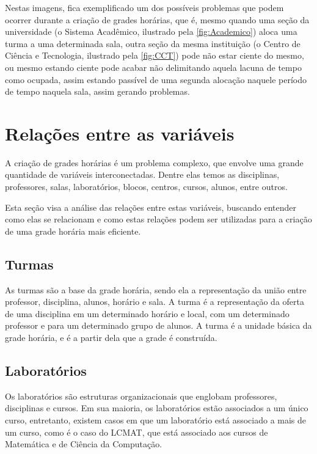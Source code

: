 Nestas imagens, fica exemplificado um dos possíveis problemas que podem ocorrer durante a criação de grades horárias, que é, mesmo quando uma seção da universidade (o Sistema Acadêmico, ilustrado pela \autoref{fig:Academico}) aloca uma turma a uma determinada sala, outra seção da mesma instituição (o Centro de Ciência e Tecnologia, ilustrado pela \autoref{fig:CCT}) pode não estar ciente do mesmo, ou mesmo estando ciente pode acabar não delimitando aquela lacuna de tempo como ocupada, assim estando passível de uma segunda alocação naquele período de tempo naquela sala, assim gerando problemas.

\section{Relações entre as variáveis} %

A criação de grades horárias é um problema complexo, que envolve uma grande quantidade de variáveis interconectadas. Dentre elas temos as disciplinas, professores, salas, laboratórios, blocos, centros, cursos, alunos, entre outros.

Esta seção visa a análise das relações entre estas variáveis, buscando entender como elas se relacionam e como estas relações podem ser utilizadas para a criação de uma grade horária mais eficiente.

\subsection{Turmas}

As turmas são a base da grade horária, sendo ela a representação da união entre professor, disciplina, alunos, horário e sala. A turma é a representação da oferta de uma disciplina em um determinado horário e local, com um determinado professor e para um determinado grupo de alunos. A turma é a unidade básica da grade horária, e é a partir dela que a grade é construída.

\subsection{Laboratórios}

Os laboratórios são estruturas organizacionais que englobam professores, disciplinas e cursos. Em sua maioria, os laboratórios estão associados a um único curso, entretanto, existem casos em que um laboratório está associado a mais de um curso, como é o caso do LCMAT, que está associado aos cursos de Matemática e de Ciência da Computação.

